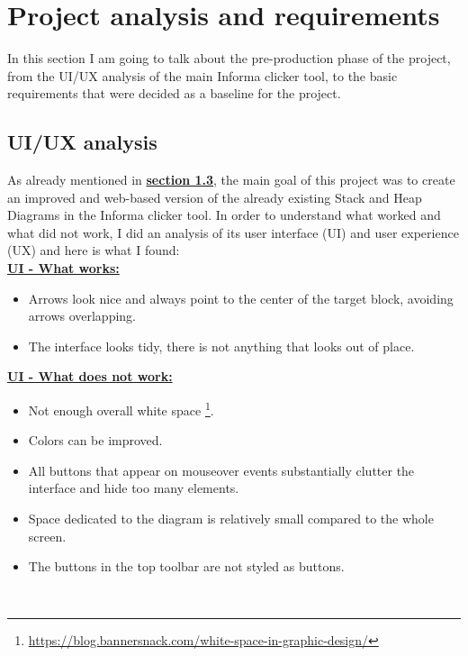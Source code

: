 \documentclass[]{usiinfbachelorproject}
\begin{document}
\pagebreak


\section{Project analysis and requirements} \label{requirements+analysis}

In this section I am going to talk about the pre-production phase of the project, from the UI/UX analysis of the main Informa clicker tool, to the basic requirements that were decided as a baseline for the project.

\subsection{UI/UX analysis}

As already mentioned in \hyperref[goal]{\textbf{section 1.3}}, the main goal of this project was to create an improved and web-based version of the already existing Stack and Heap Diagrams in the Informa clicker tool. In order to understand what worked and what did not work, I did an analysis of its user interface (UI) and user experience (UX) and here is what I found:\\

\textbf{\ul{UI - What works:}}

\begin{itemize}
	\item Arrows look nice and always point to the center of the target block, avoiding arrows overlapping.
	\item The interface looks tidy, there is not anything that looks out of place.
\end{itemize}

\vspace{\fill}

\pagebreak

\textbf{\ul{UI - What does not work:}}

\begin{itemize}
	\item Not enough overall white space \footnote{\url{https://blog.bannersnack.com/white-space-in-graphic-design/}}.
	\item Colors can be improved.
	\item All buttons that appear on mouseover events substantially clutter the interface and hide too many elements.
	\item Space dedicated to the diagram is relatively small compared to the whole screen.
	\item The buttons in the top toolbar are not styled as buttons.
\end{itemize}\
\end{document}
